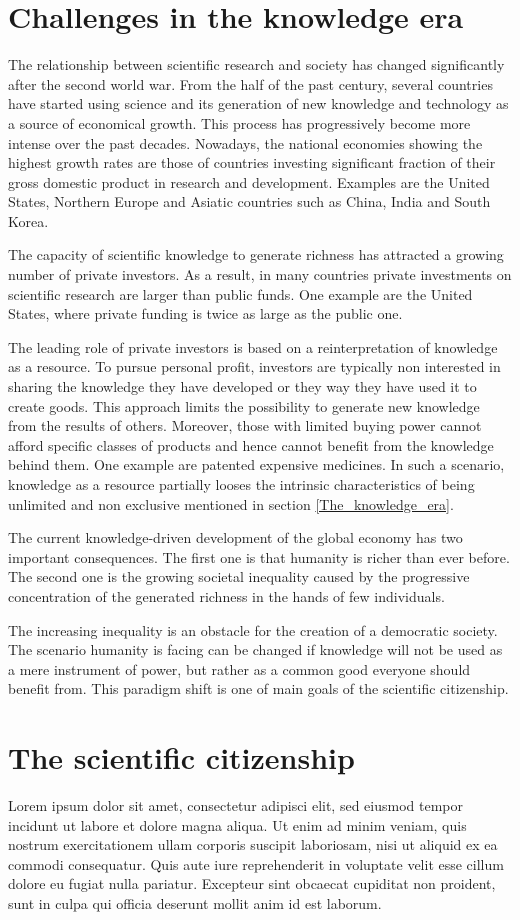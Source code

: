 \section{Challenges in the knowledge era}
The relationship between scientific research and society has changed significantly after the second world war. From the half of the past century, several countries have started using science and its generation of new knowledge and technology as a source of economical growth. This process has progressively become more intense over the past decades. Nowadays, the national economies showing the highest growth rates are those of countries investing significant fraction of their gross domestic product in research and development. Examples are the United States, Northern Europe and Asiatic countries such as China, India and South Korea.   

The capacity of scientific knowledge to generate richness has attracted a growing number of private investors. As a result, in many countries private investments on scientific research are larger than public funds. One example are the United States, where private funding is twice as large as the public one. 

The leading role of private investors is based on a reinterpretation of knowledge as a resource. To pursue personal profit, investors are typically non interested in sharing the knowledge they have developed or they way they have used it to create goods. This approach limits the possibility to generate new knowledge from the results of others. Moreover, those with limited buying power cannot afford specific classes of products and hence cannot benefit from the knowledge behind them. One example are patented expensive medicines. In such a scenario, knowledge as a resource partially looses the intrinsic characteristics of being unlimited and non exclusive mentioned in section \ref{The_knowledge_era}. 

The current knowledge-driven development of the global economy has two important consequences. The first one is that humanity is richer than ever before. The second one is the growing societal inequality caused by the progressive concentration of the generated richness in the hands of few individuals. 

The increasing inequality is an obstacle for the creation of a democratic society. The scenario humanity is facing can be changed if knowledge will not be used as a mere instrument of power, but rather as a common good everyone should benefit from. This paradigm shift is one of main goals of the scientific citizenship.

\section{The scientific citizenship}
Lorem ipsum dolor sit amet, consectetur adipisci elit, sed eiusmod tempor incidunt ut labore et dolore magna aliqua. Ut enim ad minim veniam, quis nostrum exercitationem ullam corporis suscipit laboriosam, nisi ut aliquid ex ea commodi consequatur. Quis aute iure reprehenderit in voluptate velit esse cillum dolore eu fugiat nulla pariatur. Excepteur sint obcaecat cupiditat non proident, sunt in culpa qui officia deserunt mollit anim id est laborum.